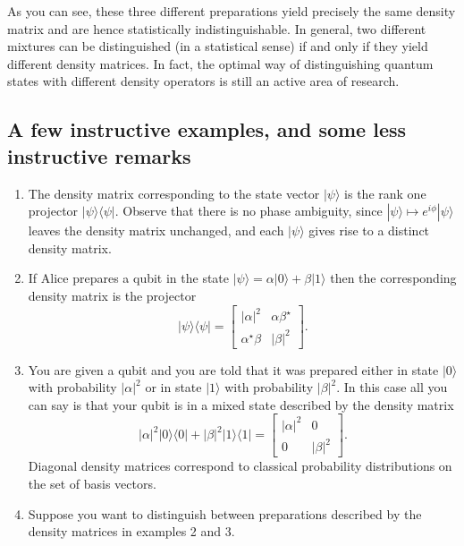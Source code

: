 \documentclass{article}
\begin{document}
As you can see, these three different preparations yield precisely the same density matrix and are hence statistically indistinguishable.
In general, two different mixtures can be distinguished (in a statistical sense) if and only if they yield different density matrices.
In fact, the optimal way of distinguishing quantum states with different density operators is still an active area of research.

\hypertarget{a-few-instructive-examples-and-some-less-instructive-remarks}{%
\subsection{A few instructive examples, and some less instructive remarks}\label{a-few-instructive-examples-and-some-less-instructive-remarks}}

\begin{enumerate}
\def\labelenumi{\arabic{enumi}.}
\item
  The density matrix corresponding to the state vector \(|\psi\rangle\) is the rank one projector \(|\psi\rangle\langle\psi|\).
  Observe that there is no phase ambiguity, since \(|\psi\rangle\mapsto e^{i\phi}|\psi\rangle\) leaves the density matrix unchanged, and each \(|\psi\rangle\) gives rise to a distinct density matrix.
\item
  If Alice prepares a qubit in the state \(|\psi\rangle = \alpha|0\rangle + \beta|1\rangle\) then the corresponding density matrix is the projector
  \[
     |\psi\rangle\langle\psi|
     =
     \begin{bmatrix}
       |\alpha|^2 & \alpha\beta^\star
     \\\alpha^\star\beta & |\beta|^2
     \end{bmatrix}.
   \]
\item
  You are given a qubit and you are told that it was prepared either in state \(|0\rangle\) with probability \(|\alpha|^2\) or in state \(|1\rangle\) with probability \(|\beta|^2\).
  In this case all you can say is that your qubit is in a mixed state described by the density matrix
  \[
     |\alpha|^2|0\rangle\langle 0| + |\beta|^2|1\rangle\langle 1|
     =
     \begin{bmatrix}
       |\alpha|^2 & 0
     \\0 & |\beta|^2
     \end{bmatrix}.
   \]
  Diagonal density matrices correspond to classical probability distributions on the set of basis vectors.
\item
  Suppose you want to distinguish between preparations described by the density matrices in examples 2 and 3.

\end{enumerate}
\end{document}
